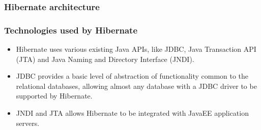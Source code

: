 \documentclass[10pt,xcolor=pdflatex]{beamer}
\begin{document}
\begin{frame}\frametitle{Hibernate architecture}
\end{frame}

\begin{frame}\frametitle{Technologies used by Hibernate}
	\begin{itemize}
		\item Hibernate uses various existing Java APIs, like JDBC, Java Transaction API (JTA) and Java Naming and Directory Interface (JNDI).
        \item JDBC provides a basic level of abstraction of functionality common to the relational databases, allowing almost any database with a JDBC driver to be supported by Hibernate.
        \item JNDI and JTA allows Hibernate to be integrated with JavaEE application servers.
	\end{itemize}
\end{frame}
\end{document}
